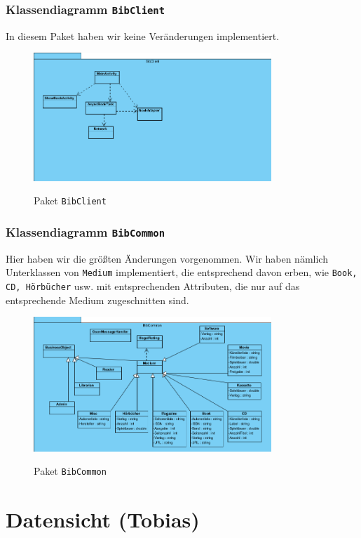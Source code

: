 \documentclass[fontsize=12pt,paper=a4,twoside]{scrartcl}
\begin{document}
\subsubsection{Klassendiagramm \texttt{BibClient}}
In diesem Paket haben wir keine Veränderungen implementiert.
\begin{figure} [H] 
\caption{Paket \texttt{BibClient}} \centering
 \includegraphics[width=0.8\textwidth]{Diagramme/bibclient.png} 
 \label{BibClient} 
\end{figure}

\subsubsection{Klassendiagramm \texttt{BibCommon}}
Hier haben wir die größten Änderungen vorgenommen. Wir haben nämlich Unterklassen von \texttt{Medium} implementiert, die entsprechend davon erben, wie \texttt{Book, CD, Hörbücher} usw. mit entsprechenden Attributen, die nur auf das entsprechende Medium zugeschnitten sind.
\begin{figure} [H] 
\caption{Paket \texttt{BibCommon}} \centering
 \includegraphics[width=0.8\textwidth]{Diagramme/bibcommon.png} 
 \label{BibCommon} 
\end{figure}


\section{Datensicht (Tobias)}
\label{sec:datensicht}
\end{document}
